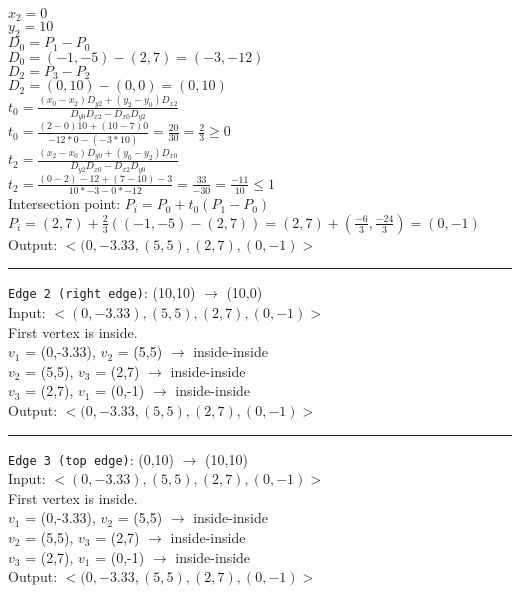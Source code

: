 \documentclass[12pt]{article}
\begin{document}
\begin{enumerate}
	$x_2 = 0$ \\
	$y_2 = 10$ \\ 
	
	$D_0 = P_1 - P_0$ \\
	$D_0 = (-1,-5) - (2,7) = (-3,-12)$ \\
	
	$D_2 = P_3 - P_2$ \\
	$D_2 = (0,10) - (0,0) = (0,10)$ \\ 
		
	$t_0 = \frac{(x_0 - x_2)D_{y2} + (y_2 - y_0)D_{x2}}{D_{y0}D_{x2} - D_{x0}D_{y2}}$ \\ 
	$t_0 = \frac{(2 - 0)10 + (10 - 7)0}{-12 * 0 - (-3*10)} = \frac{20}{30} = \frac{2}{3} \geq 0$  \\ 
	
	$t_2 = \frac{(x_2 - x_0)D_{y0} + (y_0 - y_2)D_{x0}}{D_{y2}D_{x0} - D_{x2}D_{y0}}$ \\ 
	$t_2 = \frac{(0 - 2)-12 + (7 - 10)-3}{10*-3 - 0*-12} = \frac{33}{-30} = \frac{-11}{10} \leq 1$ \\ 
	
	Intersection point:
	$P_i = P_0 + t_0(P_1 - P_0)$ \\
	$P_i = (2,7) + \frac{2}{3}((-1,-5) - (2,7)) = (2,7) + (\frac{-6}{3},\frac{-24}{3}) = (0,-1)$ \\

Output: $<(0,-3.33, (5,5), (2,7), (0,-1)>$ \\ 
\rule{\textwidth}{1pt}

\texttt{Edge 2 (right edge)}: (10,10) $\rightarrow$ (10,0) \\
Input: $<(0,-3.33), (5,5), (2,7), (0,-1)>$ \\
First vertex is inside. \\
$v_{1}$ = (0,-3.33), $v_{2}$ = (5,5) $\rightarrow$ inside-inside \\
$v_{2}$ = (5,5), $v_{3}$ = (2,7) $\rightarrow$ inside-inside \\
$v_{3}$ = (2,7), $v_{1}$ = (0,-1) $\rightarrow$ inside-inside \\ 
Output: $<(0,-3.33, (5,5), (2,7), (0,-1)>$ \\ 

\rule{\textwidth}{1pt}

\texttt{Edge 3 (top edge)}: (0,10) $\rightarrow$ (10,10) \\
Input: $<(0,-3.33), (5,5), (2,7), (0,-1)>$ \\
First vertex is inside. \\
$v_{1}$ = (0,-3.33), $v_{2}$ = (5,5) $\rightarrow$ inside-inside \\
$v_{2}$ = (5,5), $v_{3}$ = (2,7) $\rightarrow$ inside-inside \\
$v_{3}$ = (2,7), $v_{1}$ = (0,-1) $\rightarrow$ inside-inside \\ 
Output: $<(0,-3.33, (5,5), (2,7), (0,-1)>$ \\ 


\end{enumerate}
\end{document}
